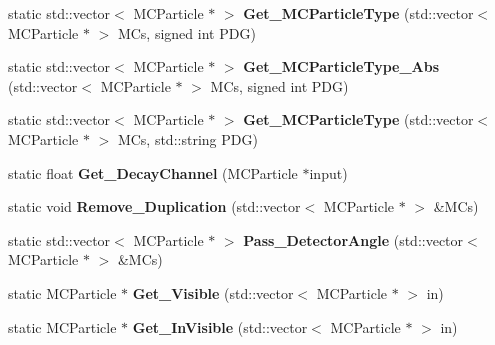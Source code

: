 \begin{DoxyCompactItemize}
\item 
\hypertarget{classToolSet_1_1CMC_a0595ad7853b51cfc631547665a3cb63e}{
static std::vector$<$ MCParticle $\ast$ $>$ {\bfseries Get\_\-MCParticleType} (std::vector$<$ MCParticle $\ast$ $>$ MCs, signed int PDG)}
\label{classToolSet_1_1CMC_a0595ad7853b51cfc631547665a3cb63e}

\item 
\hypertarget{classToolSet_1_1CMC_a8a83c548d4fa19b657194f055f5084db}{
static std::vector$<$ MCParticle $\ast$ $>$ {\bfseries Get\_\-MCParticleType\_\-Abs} (std::vector$<$ MCParticle $\ast$ $>$ MCs, signed int PDG)}
\label{classToolSet_1_1CMC_a8a83c548d4fa19b657194f055f5084db}

\item 
\hypertarget{classToolSet_1_1CMC_a186078318b357a23930ab6b61c8d9494}{
static std::vector$<$ MCParticle $\ast$ $>$ {\bfseries Get\_\-MCParticleType} (std::vector$<$ MCParticle $\ast$ $>$ MCs, std::string PDG)}
\label{classToolSet_1_1CMC_a186078318b357a23930ab6b61c8d9494}

\item 
\hypertarget{classToolSet_1_1CMC_aa16a7d3c1cbd3e1d25cf885b25d561ec}{
static float {\bfseries Get\_\-DecayChannel} (MCParticle $\ast$input)}
\label{classToolSet_1_1CMC_aa16a7d3c1cbd3e1d25cf885b25d561ec}

\item 
\hypertarget{classToolSet_1_1CMC_acd7611ff7cc945f5d198c0c0ba0b50c2}{
static void {\bfseries Remove\_\-Duplication} (std::vector$<$ MCParticle $\ast$ $>$ \&MCs)}
\label{classToolSet_1_1CMC_acd7611ff7cc945f5d198c0c0ba0b50c2}

\item 
\hypertarget{classToolSet_1_1CMC_ac483834b1710a1c4797f3b55f8f2336b}{
static std::vector$<$ MCParticle $\ast$ $>$ {\bfseries Pass\_\-DetectorAngle} (std::vector$<$ MCParticle $\ast$ $>$ \&MCs)}
\label{classToolSet_1_1CMC_ac483834b1710a1c4797f3b55f8f2336b}

\item 
\hypertarget{classToolSet_1_1CMC_a37d3453a48a49082beb6f65827fc94b4}{
static MCParticle $\ast$ {\bfseries Get\_\-Visible} (std::vector$<$ MCParticle $\ast$ $>$ in)}
\label{classToolSet_1_1CMC_a37d3453a48a49082beb6f65827fc94b4}

\item 
\hypertarget{classToolSet_1_1CMC_a89441427db18fc75e777966d5ac169b7}{
static MCParticle $\ast$ {\bfseries Get\_\-InVisible} (std::vector$<$ MCParticle $\ast$ $>$ in)}
\label{classToolSet_1_1CMC_a89441427db18fc75e777966d5ac169b7}


\end{DoxyCompactItemize}
